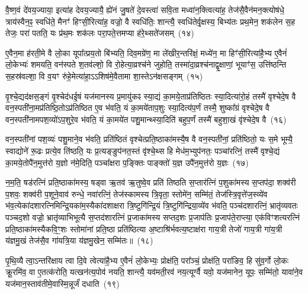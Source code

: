 वै॒ष्ण॒वं दे॑वय॒ज्याया॒ इत्या॑ह देवय॒ज्यायै॒ ह्ये॑नं जु॒षते॑ दे॒वस्त्वा॑ सवि॒ता मध्वा॑न॒क्त्वित्या॑ह॒ तेज॑सै॒वैन॑मन॒क्त्योष॑धे॒ त्राय॑स्वैन॒ꣴ॒ स्वधि॑ते॒ मैनꣳ॑ हिꣳसी॒रित्या॑ह॒ वज्रो॒ वै स्वधि॑तिः॒ शान्त्यै॒ स्वधि॑तेर्वृ॒क्षस्य॒ बिभ्य॑तः प्रथ॒मेन॒ शक॑लेन स॒ह तेजः॒ परा॑ पतति॒ यः प्र॑थ॒मः शक॑लः परा॒पते॒त्तमप्या ह॑रे॒थ्सते॑जसम्~(१४)\ip

ए॒वैन॒मा ह॑रती॒मे वै लो॒का यूपा᳚त्प्रय॒तो बि॑भ्यति॒ दिव॒मग्रे॑ण॒ मा ले॑खीर॒न्तरि॑क्षं॒ मध्ये॑न॒ मा हिꣳ॑सी॒रित्या॑है॒भ्य ए॒वैनं॑ लो॒केभ्यः॑ शमयति॒ वन॑स्पते श॒तव॑ल्\mbox{}शो॒ वि रो॒हेत्या॒व्रश्च॑ने जुहोति॒ तस्मा॑दा॒व्रश्च॑नाद्वृ॒क्षाणां॒ भूयाꣳ॑स॒ उत्ति॑ष्ठन्ति स॒हस्र॑वल्\mbox{}शा॒ वि व॒यꣳ रु॑हे॒मेत्या॑हा॒\-ऽऽ\-शिष॑मे॒वैतामा शा॒स्ते\-ऽन॑क्षसङ्गम्~(१५)\ip

वृ॒श्चे॒द्यद॑क्षस॒ङ्गं वृ॒श्चेद॑धई॒षं यज॑मानस्य प्र॒मायु॑कꣴ स्या॒द्यं का॒मये॒ताप्र॑तिष्ठितः स्या॒दित्या॑रो॒हं तस्मै॑ वृश्चेदे॒ष वै वन॒स्पती॑ना॒मप्र॑तिष्ठि॒तो\-ऽप्र॑तिष्ठित ए॒व भ॑वति॒ यं का॒मये॑ताप॒शुः स्या॒दित्य॑प॒र्णं तस्मै॒ शुष्का᳚ग्रं वृश्चेदे॒ष वै वन॒स्पती॑नामपश॒व्यो॑\-ऽप॒शुरे॒व भ॑वति॒ यं का॒मये॑त पशु॒मान्थ्स्या॒दिति॑ बहुप॒र्णं तस्मै॑ बहुशा॒खं वृ॑श्चेदे॒ष वै~(१६)\ip

वन॒स्पती॑नां पश॒व्यः॑ पशु॒माने॒व भ॑वति॒ प्रति॑ष्ठितं वृश्चेत्प्रति॒ष्ठाका॑मस्यै॒ष वै वन॒स्पती॑नां॒ प्रति॑ष्ठितो॒ यः स॒मे भूम्यै॒ स्वाद्योने॑ रू॒ढः प्रत्ये॒व ति॑ष्ठति॒ यः प्र॒त्यङ्ङुप॑नत॒स्तं वृ॑श्चे॒थ्स हि मेध॑म॒भ्युप॑नतः॒ पञ्चा॑रत्निं॒ तस्मै॑ वृश्चे॒द्यं का॒मये॒तोपै॑न॒मुत्त॑रो य॒ज्ञो न॑मे॒दिति॒ पञ्चा᳚क्षरा प॒ङ्क्तिः पाङ्क्तो॑ य॒ज्ञ उपै॑न॒मुत्त॑रो य॒ज्ञः~(१७)\ip

न॒म॒ति॒ षड॑रत्निं प्रति॒ष्ठाका॑मस्य॒ षड्वा ऋ॒तव॑ ऋ॒तुष्वे॒व प्रति॑ तिष्ठति स॒प्तार॑त्निं प॒शुका॑मस्य स॒प्तप॑दा॒ शक्व॑री प॒शवः॒ शक्व॑री प॒शूने॒वाव॑ रुन्धे॒ नवा॑रत्निं॒ तेज॑स्कामस्य त्रि॒वृता॒ स्तोमे॑न॒ सम्मि॑तं॒ तेज॑स्त्रि॒वृत्ते॑ज॒स्व्ये॑व भ॑व॒त्येका॑\-दशारत्नि\-मिन्द्रि॒यका॑म॒स्यैका॑\-दशाक्षरा त्रि॒ष्टुगि॑न्द्रि॒यं त्रि॒ष्टुगि॑न्द्रिया॒व्ये॑व भ॑वति॒ पञ्च॑दशारत्निं॒ भ्रातृ॑व्यवतः पञ्चद॒शो वज्रो॒ भ्रातृ॑व्याभिभूत्यै स॒प्तद॑शारत्निं प्र॒जाका॑मस्य सप्तद॒शः प्र॒जा\-प॑तिः प्र॒जा\-प॑ते॒राप्त्या॒ एक॑विꣳशत्यरत्निं प्रति॒ष्ठाका॑मस्यैक\-वि॒ꣳ॒शः स्तोमा॑नां प्रति॒ष्ठा प्रति॑ष्ठित्या अ॒ष्टाश्रि॑र्भवत्य॒ष्टाक्ष॑रा गाय॒त्री तेजो॑ गाय॒त्री गा॑य॒त्री य॑ज्ञमु॒खं तेज॑सै॒व गा॑यत्रि॒या य॑ज्ञमु॒खेन॒ सम्मि॑तः॥~(१८)\ip

{\anuvakamend[{जु॒षे॒ सते॑जस॒मन॑क्षसङ्गं बहुशा॒खं वृ॑श्चेदे॒ष वै य॒ज्ञ उपै॑न॒मुत्त॑रो य॒ज्ञ आप्त्या॒ एका॒न्नविꣳ॑श॒तिश्च॑}]}

पृ॒थि॒व्यै त्वा॒ऽन्तरि॑क्षाय त्वा दि॒वे त्वेत्या॑है॒भ्य ए॒वैनं॑ लो॒केभ्यः॒ प्रोक्ष॑ति॒ परा᳚ञ्चं॒ प्रोक्ष॑ति॒ परा॑ङिव॒ हि सु॑व॒र्गो लो॒कः क्रू॒रमि॑व॒ वा ए॒तत्क॑रोति॒ यत्खन॑त्य॒पोव॑ नयति॒ शान्त्यै॒ यव॑मती॒रव॑ नय॒त्यूर्ग्वै यवो॒ यज॑मानेन॒ यूपः॒ सम्मि॑तो॒ यावा॑ने॒व यज॑मान॒स्ताव॑तीमे॒वास्मि॒न्नूर्जं॑ दधाति~(१९)\ip

